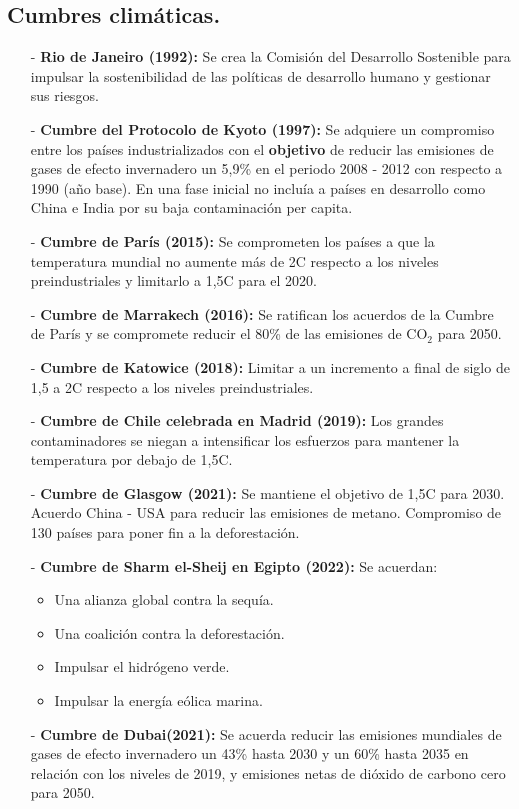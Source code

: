 \subsection{Cumbres climáticas.}
\begin{itemize}
	\item [-] \textbf{Rio de Janeiro (1992):}
		Se crea la Comisión del Desarrollo Sostenible para impulsar la sostenibilidad de las políticas de desarrollo humano y gestionar sus riesgos.
	\item [-] \textbf{Cumbre del Protocolo de Kyoto (1997):}
		Se adquiere un compromiso entre los países industrializados con el \textbf{objetivo} de reducir las emisiones de gases de efecto invernadero un 5,9\% en el periodo 2008 - 2012 con respecto a 1990 (año base). En una fase inicial no incluía a países en desarrollo como China e India por su baja contaminación per capita.
	\item [-] \textbf{Cumbre de París (2015):}
		Se comprometen los países a que la temperatura mundial no aumente más de 2\textdegree C respecto a los niveles preindustriales y limitarlo a 1,5\textdegree C para el 2020.
	\item [-] \textbf{Cumbre de Marrakech (2016):}
		Se ratifican los acuerdos de la Cumbre de París y se compromete reducir el 80\% de las emisiones de CO$_2$ para 2050.
	\item [-] \textbf{Cumbre de Katowice (2018):}
		Limitar a un incremento a final de siglo de 1,5 a 2\textdegree C respecto a los niveles preindustriales.
	\item [-] \textbf{Cumbre de Chile celebrada en Madrid (2019):}
		Los grandes contaminadores se niegan a intensificar los esfuerzos para mantener la temperatura por debajo de 1,5\textdegree C.
	\item [-] \textbf{Cumbre de Glasgow (2021):}
		Se mantiene el objetivo de 1,5\textdegree C para 2030. Acuerdo China - USA para reducir las emisiones de metano. Compromiso de 130 países para poner fin a la deforestación.
	\item [-] \textbf{Cumbre de Sharm el-Sheij en Egipto (2022):}
		Se acuerdan:
		\begin{itemize}
			\item Una alianza global contra la sequía.
			\item Una coalición contra la deforestación.
			\item Impulsar el hidrógeno verde.
			\item Impulsar la energía eólica marina.
		\end{itemize}
	\item [-] \textbf{Cumbre de Dubai(2021):}
		Se acuerda reducir las emisiones mundiales de gases de efecto invernadero un 43\% hasta
		2030 y un 60\% hasta 2035 en relación con los niveles de 2019, y emisiones netas de dióxido de carbono cero
		para 2050.
\end{itemize}
